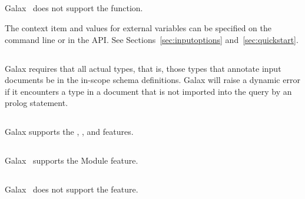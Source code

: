 \subsection*{}

   Galax \version\ does not support the  function.
 
   The context item and values for external variables can be specified
   on the command line or in the API.  See
   Sections~\ref{sec:inputoptions} and~\ref{sec:quickstart}.

\subsection*{}

Galax requires that all actual types, that is, those types that annotate
input documents be in the in-scope schema definitions.   Galax
will raise a dynamic error if it encounters a type in a document that
is not imported into the query by an  prolog statement.

\subsection*{}

Galax supports the , , and
 features. 

\subsection*{}

   Galax \version\ supports the Module feature.

\subsection*{}

   Galax \version\ does not support the  feature.

\subsection*{}

